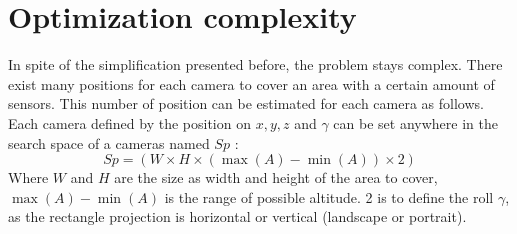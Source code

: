 %    


 
 \section{Optimization complexity} \label{sec:OptimizationComplexity}
 
In spite of the simplification presented before, the problem stays complex. There exist many positions for each camera to cover an area with a certain amount of sensors. This number of position can be estimated for each camera as follows.\\   
Each camera defined by the position on $x, y, z $ and $ \gamma$ can be set anywhere in the search space of a cameras named $Sp$ : 
\begin{equation}\label{eq:SearchSpace}
 Sp=(W\times H \times ( \max(A)-\min(A)) \times 2 )  
\end{equation}
Where $W$ and $H$ are the size as width and height of the area to cover, $\max(A)-\min(A)$ is the range of possible altitude. 2 is to define the roll $\gamma$, as the rectangle projection is horizontal or vertical (landscape or portrait).%

